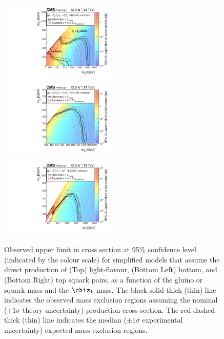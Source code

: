 \begin{figure}[thp!]
  \begin{center}
    \includegraphics[width=0.49\textwidth]{SUS16T2qqXSEC.pdf} \\
    \includegraphics[width=0.49\textwidth]{SUS16T2bbXSEC.pdf} ~
    \includegraphics[width=0.49\textwidth]{SUS16T2ttXSEC.pdf} 
    \caption{Observed upper limit in cross section at 95\% confidence
      level (indicated by the colour scale) for simplified models that
      assume the direct production of (Top) light-flavour, (Bottom
      Left) bottom, and (Bottom Right) top squark pairs, as a function
      of the gluino or squark mass and the $\chiz_{1}$ mass. The black
      solid thick (thin) line indicates the observed mass exclusion
      regions assuming the nominal (${\pm}1 \sigma$ theory
      uncertainty) production cross section. The red dashed thick
      (thin) line indicates the median (${\pm}1 \sigma$ experimental
      uncertainty) expected mass exclusion regions. 
      \label{fig:limits-sms-squark} }
  \end{center}
\end{figure}

